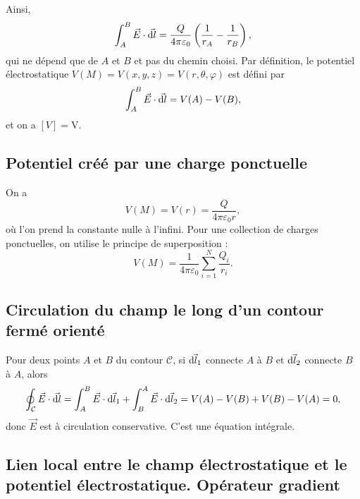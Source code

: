         Ainsi,
        \begin{equation}
            \int_{A}^{B}\vec{E}\cdot\vec{\mathrm{d} l}=\frac{Q}{4\pi\varepsilon_{0}}\left(\frac{1}{r_{A}}-\frac{1}{r_{B}}\right),
        \end{equation}
        qui ne dépend que de $A$ et $B$ et pas du chemin choisi. Par définition, le potentiel électrostatique $V(M)=V(x,y,z)=V(r,\theta,\varphi)$ est défini par 
        \begin{equation}
            \int_{A}^{B}\vec{E}\cdot\vec{\mathrm{d} l}=V(A)-V(B),
        \end{equation}
        et on a $[V]=\si{\volt}$.

    \subsection{Potentiel créé par une charge ponctuelle}

        On a 
        \begin{equation}
            \boxed{
                V(M)=V(r)=\frac{Q}{4\pi\varepsilon_{0}r},
            }
        \end{equation}
        où l'on prend la constante nulle à l'infini. Pour une collection de charges ponctuelles, on utilise le principe de superposition :
        \begin{equation}
            \boxed{
                V(M)=\frac{1}{4\pi\varepsilon_{0}}\sum_{i=1}^{N}\frac{Q_i}{r_i}.
            }
        \end{equation}

    \subsection{Circulation du champ le long d'un contour fermé orienté}

        Pour deux points $A$ et $B$ du contour $\mathcal{C}$, si $\vec{\mathrm{d} l_{1}}$ connecte $A$ à $B$ et $\vec{\mathrm{d} l_{2}}$ connecte $B$ à $A$, alors 
        \begin{equation}
            \oint_{\mathcal{C}}\vec{E}\cdot\vec{\mathrm{d} l}=\int_{A}^{B}\vec{E}\cdot\vec{\mathrm{d} l_{1}}+\int_{B}^{A}\vec{E}\cdot\vec{\mathrm{d} l_{2}}=V(A)-V(B)+V(B)-V(A)=0,
        \end{equation}
        donc $\vec{E}$ est à circulation conservative. C'est une équation intégrale.

    \subsection{Lien local entre le champ électrostatique et le potentiel électrostatique. Opérateur gradient}

